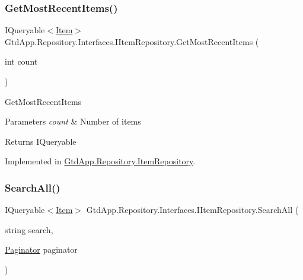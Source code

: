 \subsubsection{\texorpdfstring{Get\+Most\+Recent\+Items()}{GetMostRecentItems()}}
{\footnotesize\ttfamily I\+Queryable$<$\mbox{\hyperlink{class_gtd_app_1_1_data_1_1_item}{Item}}$>$ Gtd\+App.\+Repository.\+Interfaces.\+I\+Item\+Repository.\+Get\+Most\+Recent\+Items (\begin{DoxyParamCaption}\item[{int}]{count }\end{DoxyParamCaption})}



Get\+Most\+Recent\+Items 


\begin{DoxyParams}{Parameters}
{\em count} & Number of items\\
\hline
\end{DoxyParams}
\begin{DoxyReturn}{Returns}
I\+Queryable
\end{DoxyReturn}


Implemented in \mbox{\hyperlink{class_gtd_app_1_1_repository_1_1_item_repository_a321f8eb1347fa0543d08f3e1b2908d09}{Gtd\+App.\+Repository.\+Item\+Repository}}.

\mbox{\label{interface_gtd_app_1_1_repository_1_1_interfaces_1_1_i_item_repository_aaedb0ab68d51291cacb4a3c292bd3731}} 
\subsubsection{\texorpdfstring{Search\+All()}{SearchAll()}}
{\footnotesize\ttfamily I\+Queryable$<$\mbox{\hyperlink{class_gtd_app_1_1_data_1_1_item}{Item}}$>$ Gtd\+App.\+Repository.\+Interfaces.\+I\+Item\+Repository.\+Search\+All (\begin{DoxyParamCaption}\item[{string}]{search,  }\item[{\mbox{\hyperlink{class_gtd_app_1_1_repository_1_1_paginator}{Paginator}}}]{paginator }\end{DoxyParamCaption})}




